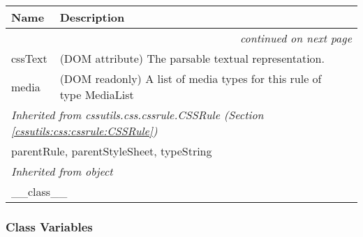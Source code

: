    \vspace{-1cm}
\hspace{\varindent}\begin{longtable}{|p{\varnamewidth}|p{\vardescrwidth}|l}
\cline{1-2}
\cline{1-2} \centering \textbf{Name} & \centering \textbf{Description}& \\
\cline{1-2}
\endhead\cline{1-2}\multicolumn{3}{r}{\small\textit{continued on next page}}\\\endfoot\cline{1-2}
\endlastfoot\raggedright c\-s\-s\-T\-e\-x\-t\- & \raggedright (DOM attribute) The parsable textual representation.&\\
\cline{1-2}
\raggedright m\-e\-d\-i\-a\- & \raggedright (DOM readonly) A list of media types for this rule of type            MediaList&\\
\cline{1-2}
\multicolumn{2}{|l|}{\textit{Inherited from cssutils.css.cssrule.CSSRule \textit{(Section \ref{cssutils:css:cssrule:CSSRule})}}}\\
\multicolumn{2}{|p{\varwidth}|}{\raggedright parentRule, parentStyleSheet, typeString}\\
\cline{1-2}
\multicolumn{2}{|l|}{\textit{Inherited from object}}\\
\multicolumn{2}{|p{\varwidth}|}{\raggedright \_\_class\_\_}\\
\cline{1-2}
\end{longtable}



  \subsubsection{Class Variables}

